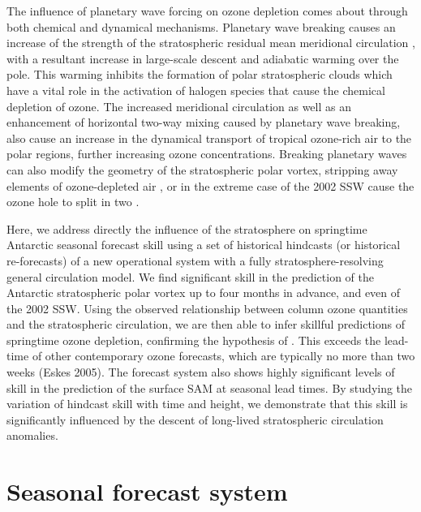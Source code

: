 The influence of planetary wave forcing on ozone depletion comes about through both chemical and dynamical mechanisms. Planetary wave breaking causes an increase of the strength of the stratospheric residual mean meridional circulation \citep{Haynes1991}, with a resultant increase in large-scale descent and adiabatic warming over the pole. This warming inhibits the formation of polar stratospheric clouds which have a vital role in the activation of halogen species that cause the chemical depletion of ozone. The increased meridional circulation as well as an enhancement of horizontal two-way mixing caused by planetary wave breaking, also cause an increase in the dynamical transport of tropical ozone-rich air to the polar regions, further increasing ozone concentrations.  Breaking planetary waves can also modify the geometry of the stratospheric polar vortex, stripping away elements of ozone-depleted air \citep{Waugh1994}, or in the extreme case of the 2002 SSW cause the ozone hole to split in two \citep{Charlton2005a}. 

Here, we address directly the influence of the stratosphere on springtime Antarctic seasonal forecast skill using a set of historical hindcasts (or historical re-forecasts) of a new operational system with a fully stratosphere-resolving general circulation model. We find significant skill in the prediction of the Antarctic stratospheric polar vortex up to four months in advance, and even of the 2002 SSW. Using the observed relationship between column ozone quantities and the stratospheric circulation, we are then able to infer skillful predictions of springtime ozone depletion, confirming the hypothesis of \citet{Salby2012}. This exceeds the lead-time of other contemporary ozone forecasts, which are typically no more than two weeks (Eskes 2005). The forecast system also shows highly significant levels of skill in the prediction of the surface SAM at seasonal lead times. By studying the variation of hindcast skill with time and height, we demonstrate that this skill is significantly influenced by the descent of long-lived stratospheric circulation anomalies. 




\section{Seasonal forecast system}

